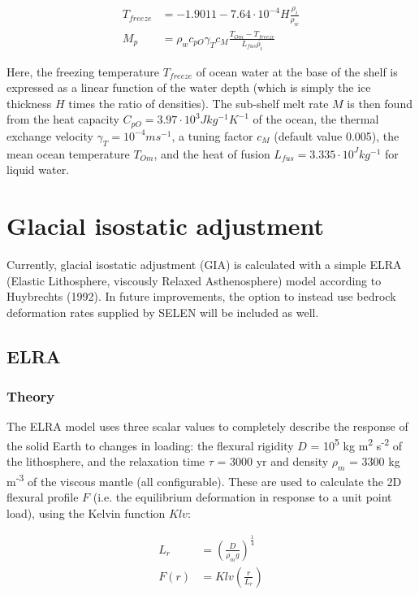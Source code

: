\documentclass{article}
\begin{document}
\begin{align}
T_{freeze} &= -1.9011 - 7.64 \cdot 10^{-4} H \frac{\rho_i}{\rho_w} \\
M_p &= \rho_w c_{pO} \gamma_T c_M \frac{T_{Om} - T_{freeze}}{L_{fus} \rho_i}
\end{align}

Here, the freezing temperature $T_{freeze}$ of ocean water at the base of the shelf is expressed as a linear function of the water depth (which is simply the ice thickness $H$ times the ratio of densities). The sub-shelf melt rate $M$ is then found from the heat capacity $C_{pO} = 3.97 \cdot 10^3 J kg^{-1} K^{-1} $ of the ocean, the thermal exchange velocity $\gamma_T = 10^{-4} m s^{-1}$, a tuning factor $c_M$ (default value 0.005), the mean ocean temperature $T_{Om}$, and the heat of fusion $L_{fus} = 3.335 \cdot 10^ J kg^{-1}$ for liquid water.\\

\newpage
\section{Glacial isostatic adjustment}

Currently, glacial isostatic adjustment (GIA) is calculated with a simple ELRA (Elastic Lithosphere, viscously Relaxed Asthenosphere) model according to Huybrechts (1992). In future improvements, the option to instead use bedrock deformation rates supplied by SELEN will be included as well.

\subsection{ELRA}

\subsubsection{Theory}

The ELRA model uses three scalar values to completely describe the response of the solid Earth to changes in loading: the flexural rigidity $D$ = 10\textsuperscript{5} kg m\textsuperscript{2} s\textsuperscript{-2} of the lithosphere, and the relaxation time $\tau$ = 3000 yr and density $\rho_m$ = 3300 kg m\textsuperscript{-3} of the viscous mantle (all configurable). These are used to calculate the 2D flexural profile $F$ (i.e. the equilibrium deformation in response to a unit point load), using the Kelvin function $Klv$:

\begin{align}
L_r &= {\left( \frac{D}{\rho_m g} \right) }^{\frac{1}{4}} \\
F(r) &= Klv( \frac{r}{L_r} )
\end{align}
\end{document}
